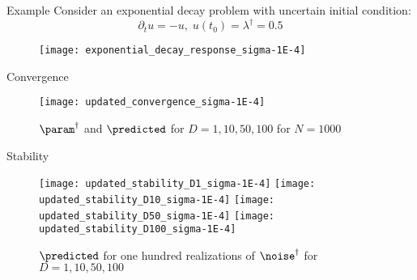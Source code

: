 \begin{block}{Example}
\centering
    Consider an exponential decay problem with uncertain initial condition:
    \begin{equation*}
        \partial_t u = - u, \; u(t_0) = \lambda^\dagger = 0.5
    \end{equation*}

    \begin{figure}
        \texttt{[image: exponential\_decay\_response\_sigma-1E-4]}
    \end{figure}

\end{block}


\begin{block}{Convergence}
\centering

    \begin{figure}
        \texttt{[image: updated\_convergence\_sigma-1E-4]}
        \caption{\large $\param^\dagger$ and $\predicted$ for $D=1, 10, 50, 100$ for $N=1000$}
    \end{figure}

\end{block}

\vspace{-1cm}

\begin{block}{Stability}

    \begin{figure}
        \texttt{[image: updated\_stability\_D1\_sigma-1E-4]}
        \texttt{[image: updated\_stability\_D10\_sigma-1E-4]}
        \texttt{[image: updated\_stability\_D50\_sigma-1E-4]}
        \texttt{[image: updated\_stability\_D100\_sigma-1E-4]}
        \caption*{\large $\predicted$ for one hundred realizations of $\noise^\dagger$ for $D=1, 10, 50, 100$}
    \end{figure}

\end{block}
